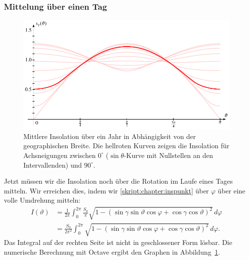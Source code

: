 \subsubsection{Mittelung über einen Tag}
\begin{figure}
\centering
\includegraphics{chapters/5/ell2.pdf}
\caption{Mittlere Insolation über ein Jahr in Abhängigkeit von der
geographischen Breite.
Die hellroten Kurven zeigen die Insolation für Achsneigungen zwischen
$0^\circ$ ($\sin\theta$-Kurve mit Nullstellen an den Intervallenden)
und $90^\circ$.
\label{skript:einstrahlung:jahrinsbild}}
\end{figure}
Jetzt müssen wir die Insolation noch über die Rotation im Laufe eines 
Tages mitteln.
Wir erreichen dies, indem wir \eqref{skript:chapter:inspunkt}
über $\varphi$ über eine volle Umdrehung mitteln:
\begin{align*}
I(\vartheta)
&=
\frac{1}{2\pi}
\int_0^{2\pi}
\frac{S_0}{\pi}
\sqrt{1-
(\sin\gamma\sin\vartheta\cos\varphi+\cos\gamma\cos\vartheta)^2}
\,d\varphi
\\
&=
\frac{S_0}{2\pi^2}
\int_0^{2\pi}
\sqrt{1-
(\sin\gamma\sin\vartheta\cos\varphi+\cos\gamma\cos\vartheta)^2}
\,d\varphi.
\label{skript:einstrahlung:mittlereinsolation}
\end{align*}
Das Integral auf der rechten Seite ist nicht in geschlossener
Form lösbar.
Die numerische Berechnung mit Octave ergibt den Graphen
in Abbildung~\ref{skript:einstrahlung:jahrinsbild}.

